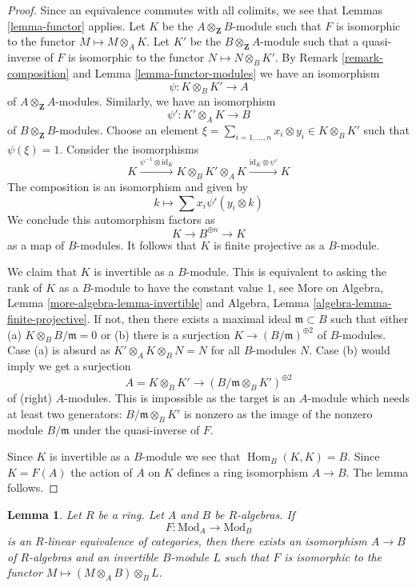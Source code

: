 \documentclass{stacks-project}
\theoremstyle{plain}
\newtheorem{lemma}[subsection]{Lemma}
\theoremstyle{definition}
\theoremstyle{remark}
\numberwithin{equation}{subsection}
\def\Hom{\mathop{\mathrm{Hom}}\nolimits}
\begin{document}
\begin{proof}
Since an equivalence commutes with all colimits, we see that
Lemmas \ref{lemma-functor} applies. Let $K$ be the
$A \otimes_\mathbf{Z} B$-module such that $F$ is
isomorphic to the functor $M \mapsto M \otimes_A K$.
Let $K'$ be the $B \otimes_\mathbf{Z} A$-module such that
a quasi-inverse of $F$ is
isomorphic to the functor $N \mapsto N \otimes_B K'$.
By Remark \ref{remark-composition} and
Lemma \ref{lemma-functor-modules} we have an isomorphism
$$
\psi : K \otimes_B K' \longrightarrow A
$$
of $A \otimes_\mathbf{Z} A$-modules.
Similarly, we have an isomorphism
$$
\psi' : K' \otimes_A K \longrightarrow B
$$
of $B \otimes_\mathbf{Z} B$-modules. Choose an element
$\xi = \sum_{i = 1, \ldots, n} x_i \otimes y_i \in K \otimes_B K'$
such that $\psi(\xi) = 1$. Consider the isomorphisms
$$
K \xrightarrow{\psi^{-1} \otimes \text{id}_K}
K \otimes_B K' \otimes_A K \xrightarrow{\text{id}_K \otimes \psi'} K
$$
The composition is an isomorphism and given by
$$
k \longmapsto \sum x_i \psi'(y_i \otimes k)
$$
We conclude this automorphism factors as
$$
K \to B^{\oplus n} \to K
$$
as a map of $B$-modules. It follows that $K$ is finite
projective as a $B$-module.

\medskip\noindent
We claim that $K$ is invertible as a $B$-module. This is equivalent
to asking the rank of $K$ as a $B$-module to have the constant value $1$,
see More on Algebra, Lemma \ref{more-algebra-lemma-invertible} and
Algebra, Lemma \ref{algebra-lemma-finite-projective}.
If not, then there exists a maximal ideal $\mathfrak m \subset B$
such that either (a) $K \otimes_B B/\mathfrak m = 0$ or
(b) there is a surjection $K \to (B/\mathfrak m)^{\oplus 2}$ of
$B$-modules. Case (a) is absurd as $K' \otimes_A K \otimes_B N = N$
for all $B$-modules $N$. Case (b) would imply we get a surjection
$$
A = K \otimes_B K' \longrightarrow (B/\mathfrak m \otimes_B K')^{\oplus 2}
$$
of (right) $A$-modules. This is impossible as the target is an $A$-module
which needs at least two generators: $B/\mathfrak m \otimes_B K'$
is nonzero as the image of the nonzero module $B/\mathfrak m$ under
the quasi-inverse of $F$.

\medskip\noindent
Since $K$ is invertible as a $B$-module we see that $\Hom_B(K, K) = B$.
Since $K = F(A)$ the action of $A$ on $K$ defines a ring isomorphism
$A \to B$. The lemma follows.
\end{proof}

\begin{lemma}
\label{lemma-functor-equivalence-linear}
Let $R$ be a ring. Let $A$ and $B$ be $R$-algebras. If
$$
F : \text{Mod}_A \longrightarrow \text{Mod}_B
$$
is an $R$-linear equivalence of categories, then there exists an isomorphism
$A \to B$ of $R$-algebras and an invertible $B$-module $L$ such that
$F$ is isomorphic to the functor $M \mapsto (M \otimes_A B) \otimes_B L$.
\end{lemma}
\end{document}
